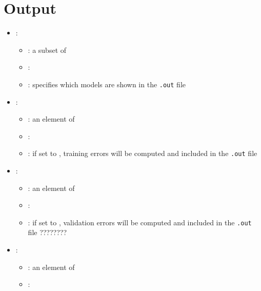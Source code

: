 \section{Output}



\begin{itemize}
    \item {}:
           \begin{itemize}
                \item \optionPossibleValues{}: a subset of 
                \item \optionDefaultValue{}: 
                \item \optionDescrption{}: specifies which models are shown in the \texttt{.out} file
           \end{itemize}
    \item {}:
           \begin{itemize}
                \item \optionPossibleValues{}: an element of 
                \item \optionDefaultValue{}: 
                \item \optionDescrption{}: if set to , training errors will be computed and included in the \texttt{.out} file
           \end{itemize}
    \item {}:
           \begin{itemize}
                \item \optionPossibleValues{}: an element of 
                \item \optionDefaultValue{}: 
                \item \optionDescrption{}: if set to , validation errors will be computed and included in the \texttt{.out} file ????????
           \end{itemize}
    \item {}:
           \begin{itemize}
                \item \optionPossibleValues{}: an element of 
                \item \optionDefaultValue{}: 

\end{itemize}
\end{itemize}
